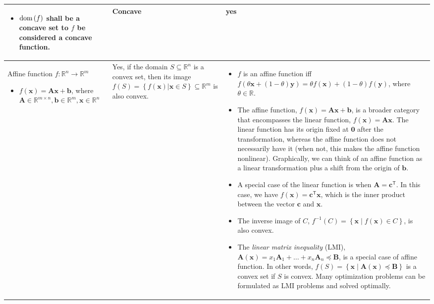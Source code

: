 \documentclass{article}
\newcommand{\dom}[1]{\ensuremath{\textnormal{dom}\left(#1\right)}} %
\begin{document}
\begin{table}[ht!]
\begin{tabularx}{\textwidth}{|>{\setlength\hsize{1\hsize}\setlength\linewidth{\hsize}}X|>{\setlength\hsize{.9\hsize}\setlength\linewidth{\hsize}}X|>{\setlength\hsize{1.1\hsize}\setlength\linewidth{\hsize}}X|}
\begin{itemize}[leftmargin=*]
            \item \(\dom{f}\) shall be a concave set to \(f\) be considered a concave function.
        \end{itemize} & Concave & yes \\
        \hline
        Affine function \(f: \mathbb{R}^n \rightarrow \mathbb{R}^m\)
        \begin{itemize}[leftmargin=*]
            \item $f(\mathbf{x}) = \mathbf{Ax} + \mathbf{b}$, where \(\mathbf{A} \in \mathbb{R}^{m\times n}, \mathbf{b} \in \mathbb{R}^{m}, \mathbf{x} \in \mathbb{R}^{n}\)
        \end{itemize} & Yes, if the domain \(S \subseteq \mathbb{R}^{n}\) is a convex set, then its image \(f(S) = \left\{ f(\mathbf{x})|\mathbf{x}\in S \right\} \subseteq \mathbb{R}^{m}\) is also convex. & \vspace{-3.5ex} \begin{itemize}[leftmargin=*]
            \item $f$ is an affine function iff $f(\theta \mathbf{x} + (1-\theta)\mathbf{y}) = \theta f(\mathbf{x}) + (1-\theta)f(\mathbf{y})$, where \(\theta \in \mathbb{R}\).
            \item The affine function, \(f(\mathbf{x}) = \mathbf{Ax} + \mathbf{b}\), is a broader category that encompasses the linear function, \(f(\mathbf{x}) = \mathbf{Ax}\). The linear function has its origin fixed at \(\mathbf{0}\) after the transformation, whereas the affine function does not necessarily have it (when not, this makes the affine function nonlinear). Graphically, we can think of an affine function as a linear transformation plus a shift from the origin of \(\mathbf{b}\).
            \item A special case of the linear function is when \(\mathbf{A} = \mathbf{c}^\mathsf{T}\). In this case, we have \(f(\mathbf{x}) = \mathbf{c}^\mathsf{T}\mathbf{x}\), which is the inner product between the vector \(\mathbf{c}\) and \(\mathbf{x}\).
            \item The inverse image of \(C\), \(f^{-1}(C) = \left\{ \mathbf{x} \mid f(\mathbf{x}) \in C \right\}\), is also convex.
            \item The \emph{linear matrix inequality} (LMI), \(\mathbf{A}(\mathbf{x}) = x_1\mathbf{A}_1 + \dots + x_n\mathbf{A}_n \preceq \mathbf{B}\), is a special case of affine function. In other words, \(f(S) = \left\{ \mathbf{x} \mid \mathbf{A}(\mathbf{x}) \preceq \mathbf{B} \right\}\) is a convex set if \(S\) is convex. Many optimization problems can be formulated as LMI problems and solved optimally.

\end{itemize}
\end{tabularx}
\end{table}
\end{document}
